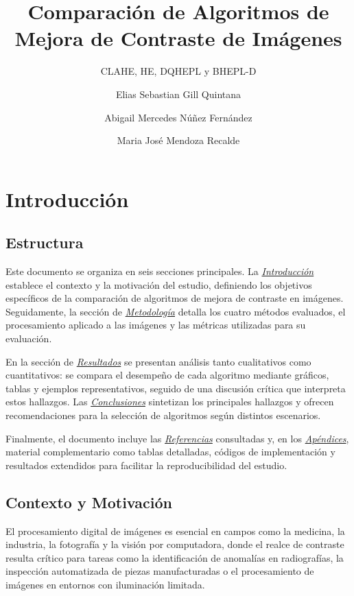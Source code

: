 \documentclass[sigchi]{acmart}
\title{Comparación de Algoritmos de Mejora de Contraste de Imágenes}
\subtitle{CLAHE, HE, DQHEPL y BHEPL-D}
\author{Elias Sebastian Gill Quintana}
\affiliation{
    \institution{Facultad Politecnica - UNA}
    \city{San Lorenzo}
    \country{Paraguay}
}
\author{Abigail Mercedes Núñez Fernández}
\affiliation{
    \institution{Facultad Politecnica - UNA}
    \city{San Lorenzo}
    \country{Paraguay}
}
\author{Maria José Mendoza Recalde}
\affiliation{
    \institution{Facultad Politecnica - UNA}
    \city{San Lorenzo}
    \country{Paraguay}
}
\begin{document}
\maketitle

\section{Introducción}

\subsection{Estructura}
\label{subsec:estructura}

Este documento se organiza en seis secciones principales. La
\emph{\hyperref[sec:contexto]{Introducción}} establece el contexto y la motivación del
estudio, definiendo los objetivos específicos de la comparación de algoritmos de mejora de
contraste en imágenes. Seguidamente, la sección de
\emph{\hyperref[sec:metodologia]{Metodología}} detalla los cuatro métodos evaluados, el
procesamiento aplicado a las imágenes y las métricas utilizadas para su evaluación.

En la sección de \emph{\hyperref[sec:resultados]{Resultados}} se presentan análisis tanto
cualitativos como cuantitativos: se compara el desempeño de cada algoritmo mediante gráficos,
tablas y ejemplos representativos, seguido de una discusión crítica que interpreta estos
hallazgos. Las \emph{\hyperref[sec:conclusiones]{Conclusiones}} sintetizan los principales
hallazgos y ofrecen recomendaciones para la selección de algoritmos según distintos escenarios.

Finalmente, el documento incluye las \emph{\hyperref[sec:bibliography]{Referencias}} consultadas
y, en los \emph{\hyperref[sec:apendices]{Apéndices}}, material complementario como tablas
detalladas, códigos de implementación y resultados extendidos para facilitar la
reproducibilidad del estudio.

\subsection{Contexto y Motivación}
\label{subsec:contexto}

El procesamiento digital de imágenes es esencial en campos como la medicina, la industria, la
fotografía y la visión por computadora, donde el realce de contraste resulta crítico para
tareas como la identificación de anomalías en radiografías, la inspección automatizada de
piezas manufacturadas o el procesamiento de imágenes en entornos con iluminación limitada.
\end{document}
